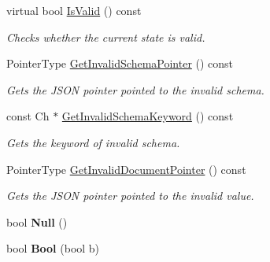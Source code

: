 \begin{DoxyCompactItemize}
virtual bool \hyperlink{class_generic_schema_validator_a8ebda4da3d8b1fc41e57f15dd62e8f19}{Is\+Valid} () const
\begin{DoxyCompactList}\small\item\em Checks whether the current state is valid. \end{DoxyCompactList}\item 
\mbox{\label{class_generic_schema_validator_a5b8f2d5c466b2a362e2e4c3bcfbfc5a8}} 
Pointer\+Type \hyperlink{class_generic_schema_validator_a5b8f2d5c466b2a362e2e4c3bcfbfc5a8}{Get\+Invalid\+Schema\+Pointer} () const
\begin{DoxyCompactList}\small\item\em Gets the J\+S\+ON pointer pointed to the invalid schema. \end{DoxyCompactList}\item 
\mbox{\label{class_generic_schema_validator_ab71ec18e5a013e5153a10b312a4f03bc}} 
const Ch $\ast$ \hyperlink{class_generic_schema_validator_ab71ec18e5a013e5153a10b312a4f03bc}{Get\+Invalid\+Schema\+Keyword} () const
\begin{DoxyCompactList}\small\item\em Gets the keyword of invalid schema. \end{DoxyCompactList}\item 
\mbox{\label{class_generic_schema_validator_ac10a88c4dc138bbdbe2afd041658a3b0}} 
Pointer\+Type \hyperlink{class_generic_schema_validator_ac10a88c4dc138bbdbe2afd041658a3b0}{Get\+Invalid\+Document\+Pointer} () const
\begin{DoxyCompactList}\small\item\em Gets the J\+S\+ON pointer pointed to the invalid value. \end{DoxyCompactList}\item 
\mbox{\label{class_generic_schema_validator_a7137af73e934f50c66cbb8a9aa802ea6}} 
bool {\bfseries Null} ()
\item 
\mbox{\label{class_generic_schema_validator_aa25fa7456f2f308a105e400f01a4afde}} 
bool {\bfseries Bool} (bool b)
\item 
\mbox{\label{class_generic_schema_validator_ad823c29990225661a4df69d34647b659}} 

\end{DoxyCompactItemize}
